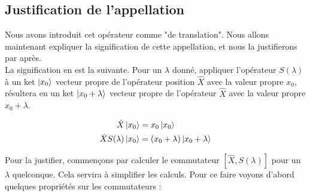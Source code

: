 \documentclass[../notesdecours]{subfiles}
\begin{document}
\subsection{Justification de l'appellation}
Nous avons introduit cet opérateur comme "de translation". Nous allons maintenant expliquer la signification de cette appellation, et nous la justifierons par après.\\

La signification en est la suivante. Pour un $\lambda$ donné, appliquer l'opérateur $S(\lambda)$ à un ket $\ket{x_0}$ vecteur propre de l'opérateur position $\hat X$ avec la valeur propre $x_0$, résultera en un ket $\ket{x_0+\lambda}$ vecteur propre de l'opérateur $\hat X$ avec la valeur propre $x_0+\lambda$.

\begin{align}
\hat X \ket{x_0}&= x_0 \ket{x_0} \notag \\
	\hat X S(\lambda)\ket{x_0} &= (x_0+\lambda) \ket{x_0+\lambda} \label{eq:chap6-operateur_translation_signification}
\end{align}

Pour la justifier, commençons par calculer le commutateur $[\hat X, S(\lambda)]$ pour un $\lambda$ quelconque. Cela servira à simplifier les calculs. Pour ce faire voyons d'abord quelques propriétés sur les commutateurs : 
\end{document}
